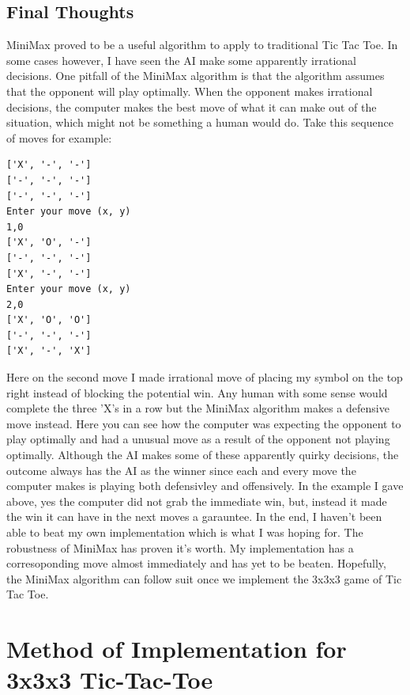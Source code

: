 \documentclass[letterpaper]{article}
\begin{document}
\subsection {Final Thoughts}
MiniMax proved to be a useful algorithm to apply to traditional Tic Tac Toe. In some cases however, I have seen the AI make some apparently irrational decisions. One pitfall of the MiniMax algorithm is that the algorithm assumes that the opponent will play optimally. When the opponent makes irrational decisions, the computer makes the best move of what it can make out of the situation, which might not be something a human would do. Take this sequence of moves for example:
\begin{lstlisting}
['X', '-', '-']
['-', '-', '-']
['-', '-', '-']
Enter your move (x, y)
1,0
['X', 'O', '-']
['-', '-', '-']
['X', '-', '-']
Enter your move (x, y)
2,0
['X', 'O', 'O']
['-', '-', '-']
['X', '-', 'X']  
\end{lstlisting}
Here on the second move I made irrational move of placing my symbol on the top right instead of blocking the potential win. Any human with some sense would complete the three 'X's in a row but the MiniMax algorithm makes a defensive move instead. Here you can see how the computer was expecting the opponent to play optimally and had a unusual move as a result of the opponent not playing optimally. Although the AI makes some of these apparently quirky decisions, the outcome always has the AI as the winner since each and every move the computer makes is playing both defensivley and offensively. In the example I gave above, yes the computer did not grab the immediate win, but, instead it made the win it can have in the next moves a garauntee. In the end, I haven't been able to beat my own implementation which is what I was hoping for. The robustness of MiniMax has proven it's worth. My implementation has a corresoponding move almost immediately and has yet to be beaten. Hopefully, the MiniMax algorithm can follow suit once we implement the 3x3x3 game of Tic Tac Toe.

\section{Method of Implementation for 3x3x3 Tic-Tac-Toe}
\end{document}
